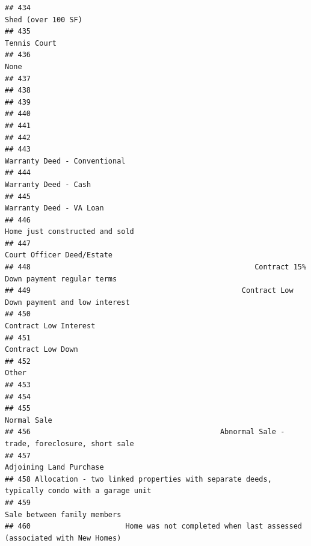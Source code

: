 \documentclass[
]{article}
\begin{document}
\begin{verbatim}
## 434                                                                         Shed (over 100 SF)
## 435                                                                               Tennis Court
## 436                                                                                       None
## 437                                                                                           
## 438                                                                                           
## 439                                                                                           
## 440                                                                                           
## 441                                                                                           
## 442                                                                                           
## 443                                                               Warranty Deed - Conventional
## 444                                                                       Warranty Deed - Cash
## 445                                                                    Warranty Deed - VA Loan
## 446                                                             Home just constructed and sold
## 447                                                                  Court Officer Deed/Estate
## 448                                                    Contract 15% Down payment regular terms
## 449                                                 Contract Low Down payment and low interest
## 450                                                                      Contract Low Interest
## 451                                                                          Contract Low Down
## 452                                                                                      Other
## 453                                                                                           
## 454                                                                                           
## 455                                                                                Normal Sale
## 456                                            Abnormal Sale -  trade, foreclosure, short sale
## 457                                                                    Adjoining Land Purchase
## 458 Allocation - two linked properties with separate deeds, typically condo with a garage unit
## 459                                                                Sale between family members
## 460                      Home was not completed when last assessed (associated with New Homes)
\end{verbatim}
\end{document}
